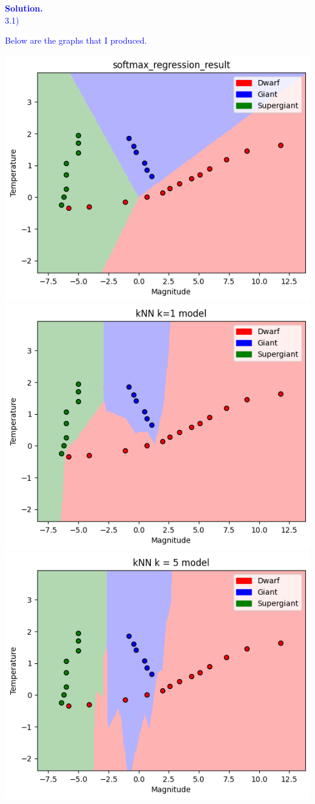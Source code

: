 \documentclass[submit]{harvardml}
\begin{document}
\textcolor{blue}{\textbf{Solution.} \\
3.1)
\begin{center}
    Below are the graphs that I produced. 
\end{center}
\includegraphics[width=\textwidth]{images/1.png}
\includegraphics[width=\textwidth]{images/2.png}
\includegraphics[width=\textwidth]{images/3.png}
}
\end{document}
